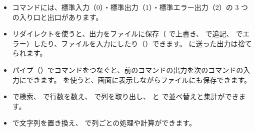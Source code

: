 \begin{itemize}
  \item コマンドには、標準入力（0）・標準出力（1）・標準エラー出力（2）の 3 つの入り口と出口があります。
  \item リダイレクトを使うと、出力をファイルに保存（\cmd{>} で上書き、\cmd{>>} で追記、 でエラー）したり、ファイルを入力にしたり（\cmd{<}）できます。 に送った出力は捨てられます。
  \item パイプ（\cmd{|}）でコマンドをつなぐと、前のコマンドの出力を次のコマンドの入力にできます。 を使うと、画面に表示しながらファイルにも保存できます。
  \item {} で検索、 で行数を数え、 で列を取り出し、 と  で並べ替えと集計ができます。
  \item {} で文字列を置き換え、 で列ごとの処理や計算ができます。
\end{itemize}

